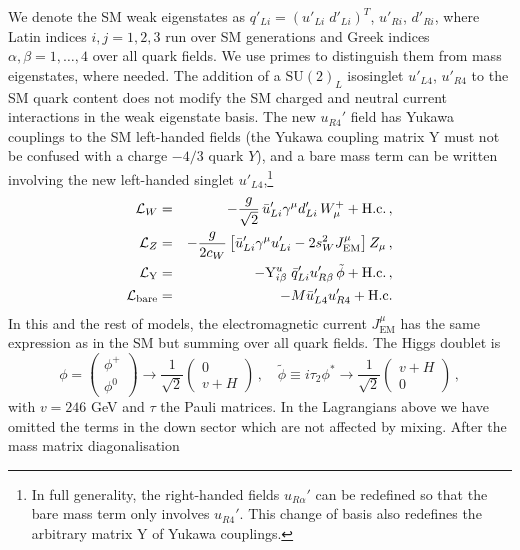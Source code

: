 \documentclass[12pt,a4paper]{article}
\newcommand{\gm}{\gamma^\mu}
\newcommand{\Wmp}{W_\mu^+}
\newcommand{\Zm}{Z_\mu}
\begin{document}
We denote the SM weak eigenstates as $q'_{Li}=(u'_{Li} \; d'_{Li})^T$, $u'_{Ri}$, $d'_{Ri}$, where Latin indices $i,j=1,2,3$ run over SM generations and Greek indices $\alpha,\beta=1,\dots,4$ over all quark fields. 
We use primes to distinguish them from mass eigenstates, where needed.
The addition of a $\text{SU}(2)_L$ isosinglet $u'_{L4}$, $u'_{R4}$ to the SM quark content does not modify the SM charged and neutral current interactions in the weak eigenstate basis. The new $u_{R4}'$ field has Yukawa couplings to the SM left-handed fields
(the Yukawa coupling matrix $\mathrm{Y}$ must not be confused with a charge $-4/3$ quark $Y$),
and a bare mass term can be written involving the new left-handed singlet $u'_{L4}$,\footnote{In full generality, the right-handed fields $u_{R\alpha}'$ can be redefined so that the bare mass term only involves  $u_{R4}'$. This change of basis also redefines the arbitrary matrix $\mathrm{Y}$ of Yukawa couplings.}
\begin{eqnarray}
\mathcal{L}_W & = & -\frac{g}{\sqrt 2} \, \bar u_{Li}' \gm d'_{Li} \, \Wmp + \text{H.c.}
\,, \notag \\
%
\mathcal{L}_Z & = & -\frac{g}{2 c_W} \left[ \bar u'_{Li} \gm u'_{Li} - 2 s_W^2 J_\text{EM}^\mu \right] \Zm \,, \notag \\
%
\mathcal{L}_\text{Y}  & = & - \mathrm{Y}_{i\beta}^u \; \bar q'_{Li} u'_{R\beta} \, \tilde \phi + \text{H.c.}
\,, \notag \\
\mathcal{L}_\text{bare}  & = & - M \bar u_{L4}' u_{R4}' + \text{H.c.}
\end{eqnarray}
In this and the rest of models,
the electromagnetic current $J_\text{EM}^\mu$ has the same expression as in the SM but summing over all quark fields. 
The Higgs doublet is
\begin{equation}
\phi = \left( \!\begin{array}{c} \phi^+ \\ \phi^0 \end{array} \!\right)
\to \frac{1}{\sqrt 2} \left( \!\begin{array}{c} 0 \\ v + H \end{array} \!\right) \,,\quad
\tilde \phi \equiv i\tau_2 \phi^*
\to \frac{1}{\sqrt 2} \left( \!\begin{array}{c} v + H \\ 0 \end{array} \!\right) \,,
\end{equation}
with $v=246$ GeV and $\tau$ the Pauli matrices. In the Lagrangians above we have omitted the terms in the down sector which are not affected by mixing. After the mass matrix diagonalisation
\end{document}
